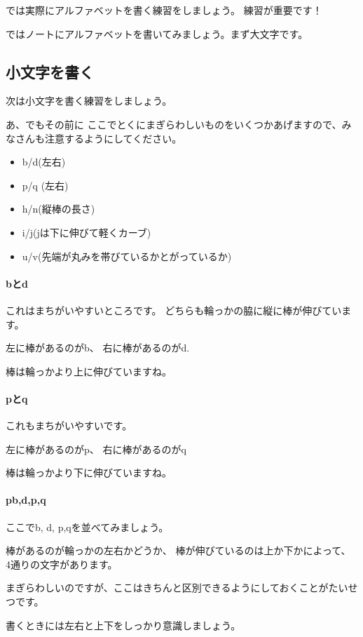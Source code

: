 \documentclass[12pt]{jlreq}
\begin{document}
では実際にアルファベットを書く練習をしましょう。
練習が重要です！


ではノートにアルファベットを書いてみましょう。まず大文字です。

\subsection{小文字を書く}

次は小文字を書く練習をしましょう。

あ、でもその前に
ここでとくにまぎらわしいものをいくつかあげますので、みなさんも注意するようにしてください。

\begin{itemize}
 \item  b/d(左右)
 \item  p/q (左右)
 \item h/n(縦棒の長さ)
 \item i/j(jは下に伸びて軽くカーブ)
 \item u/v(先端が丸みを帯びているかとがっているか)
\end{itemize}


\paragraph{bとd}

これはまちがいやすいところです。
どちらも輪っかの脇に縦に棒が伸びています。

左に棒があるのがb、
右に棒があるのがd.

棒は輪っかより上に伸びていますね。

\paragraph{pとq}
これもまちがいやすいです。


左に棒があるのがp、
右に棒があるのがq

棒は輪っかより下に伸びていますね。
\paragraph{pb,d,p,q}

ここでb, d, p,qを並べてみましょう。

棒があるのが輪っかの左右かどうか、
棒が伸びているのは上か下かによって、
4通りの文字があります。

まぎらわしいのですが、ここはきちんと区別できるようにしておくことがたいせつです。

書くときには左右と上下をしっかり意識しましょう。
\end{document}
